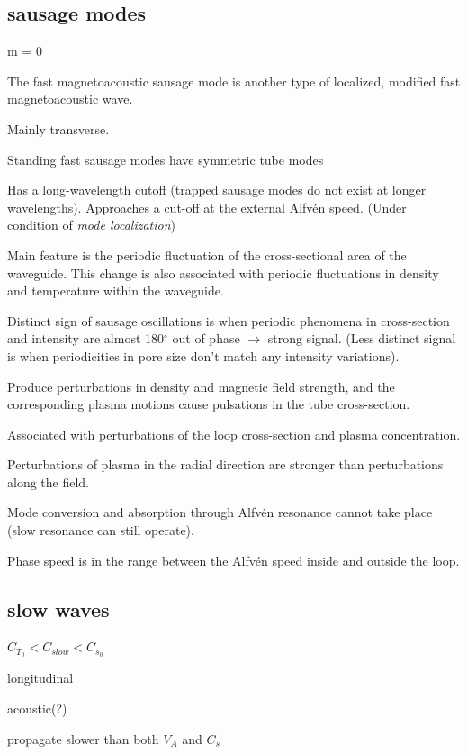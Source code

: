 \documentclass[12pt]{article}
\begin{document}
\subsection*{sausage modes}
\begin{itemize*}
    \item m = 0
    \item The fast magnetoacoustic sausage mode is another type of
        localized, modified fast magnetoacoustic wave.
    \item Mainly transverse.
    \item Standing fast sausage modes have symmetric tube modes
    \item Has a long-wavelength cutoff (trapped sausage modes do
        not exist at longer wavelengths).
        Approaches a cut-off at the external Alfv\'en speed.
        (Under condition of \emph{mode localization})
    \item Main feature is the periodic fluctuation of the cross-sectional
        area of the waveguide. This change is also associated with
        periodic fluctuations in density and temperature within the
        waveguide.
    \item Distinct sign of sausage oscillations is when periodic
        phenomena in cross-section and intensity are almost
        180$^{\circ}$ out of phase $\rightarrow$ strong signal.
        (Less distinct signal is when periodicities in pore size
        don't match any intensity variations).
    \item Produce perturbations in density and magnetic field strength,
        and the corresponding plasma motions cause pulsations in the
        tube cross-section.
    \item Associated with perturbations of the loop cross-section
        and plasma concentration.
    \item Perturbations of plasma in the radial direction are stronger
        than perturbations along the field.
    \item Mode conversion and absorption through Alfv\'en resonance
        cannot take place (slow resonance can still operate).
    \item Phase speed is in the range between the Alfv\'en speed inside
        and outside the loop.
\end{itemize*}

\subsection*{slow waves}
\begin{itemize*}
    \item $C_{T_0} < C_{slow} < C_{s_0}$
    \item longitudinal
    \item acoustic(?)
    \item propagate slower than both $V_A$ and $C_s$
\end{itemize*}
\end{document}
